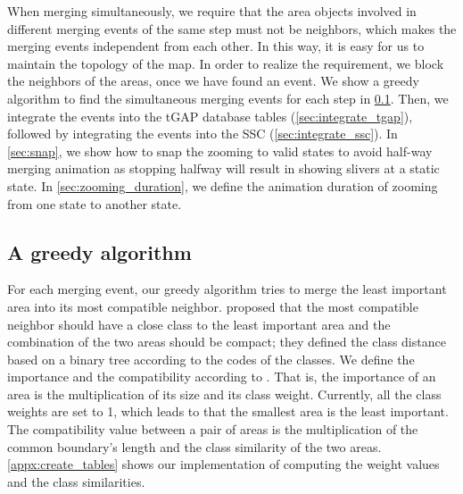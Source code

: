 \documentclass[twocolumn]{svjour3}          %
\begin{document}
When merging simultaneously,
we require that 
the area objects involved in different merging events of the same step 
must not be neighbors, 
which makes the merging events independent from each other.
In this way, it is easy for us to maintain the topology of the map.
In order to realize the requirement,
we block the neighbors of the areas, once we have found an event.
We show a greedy algorithm to find the simultaneous merging events for each step
in \sect\ref{sec:greedy_algo}.
Then, we integrate the events into the tGAP database tables
(\sect\ref{sec:integrate_tgap}),
followed by integrating the events into the SSC 
(\sect\ref{sec:integrate_ssc}).
In \sect\ref{sec:snap}, we show how to snap the zooming to valid states
to avoid half-way merging animation 
as stopping halfway will result in showing slivers at a static state.
In \sect\ref{sec:zooming_duration}, we define 
the animation duration of zooming from one state to another state.


\subsection{A greedy algorithm}
\label{sec:greedy_algo}

For each merging event, our greedy algorithm tries to 
merge the least important area into its most compatible neighbor.
\citet{Peng2020AreaAgg} proposed that 
the most compatible neighbor should have a close class
to the least important area
and the combination of the two areas should be compact;
they defined the class distance based on a binary tree
according to the codes of the classes.
We define the importance and the compatibility according to
\citet{vanPutten1998NewGAP}.
That is, the importance of an area is the multiplication 
of its size and its class weight.
Currently, all the class weights are set to 1,
which leads to that the smallest area is the least important.
The compatibility value between a pair of areas is 
the multiplication of the common boundary's length and 
the class similarity of the two areas.
\appx\ref{appx:create_tables} shows our implementation of
computing the weight values and the class similarities.
\end{document}
